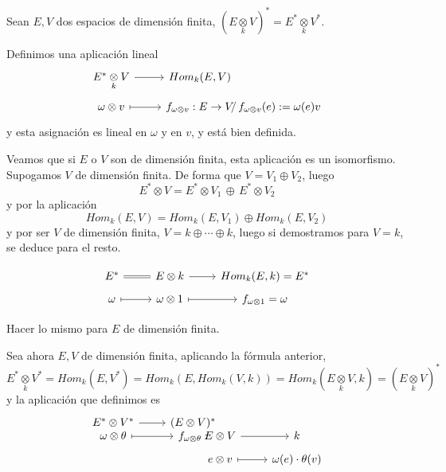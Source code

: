 \begin{prop}
    Sean $E,V$ dos espacios de dimensi\'on finita, $(E \underset{k}{\otimes}V)^* = E^* \underset{k}{\otimes}V^*$. 
\end{prop}
\begin{dem}
    Definimos una aplicaci\'on lineal
    $$\bt E^* \underset{k}{\otimes}V \arrow{r} & Hom_k(E,V) \\[-5mm] 
    \omega \otimes v \arrow[mapsto]{r} & f_{\omega\otimes v}: E \to V &[-13mm] \, /\, f_{\omega\otimes v}(e):= \omega (e) v   \et$$
    y esta asignaci\'on es lineal en $\omega$ y en $v$, y est\'a bien definida.

    Veamos que si $E$ o $V$ son de dimensi\'on finita, esta aplicaci\'on es un isomorfismo. Supogamos $V$ de dimensi\'on finita. De forma que $V=V_1\oplus V_2$, luego 
    $$E^* \otimes V = E^* \otimes V_1 \,  \oplus \, E^* \otimes V_2$$
    y por la aplicaci\'on
    $$Hom_k(E, V) = Hom_k(E,V_1) \oplus Hom_k(E, V_2)$$
    y por ser $V$ de dimensi\'on finita, $V=k \oplus \cdots \oplus k$, luego si demostramos para $V=k$, se deduce para el resto. 

    $$\bt E^* \arrow[equal]{r} & E\otimes k \arrow{r} & Hom_k(E,k) = E^* \\[-5mm] \omega \arrow[mapsto]{r} & \omega \otimes 1 \arrow[mapsto]{r} & f_{\omega \otimes 1} = \omega \et$$

    Hacer lo mismo para $E$ de dimensi\'on finita. 

    Sea ahora $E, V$ de dimensi\'on finita, aplicando la f\'ormula anterior,
    $$E^* \underset{k}{\otimes}V^* = Hom_k(E, V^*) = Hom_k(E, Hom_k(V,k)) = Hom_k(E\underset{k}{\otimes} V,k) = (E\underset{k}{\otimes} V)^*$$
    y la aplicaci\'on que definimos es
    $$\bt E^* \otimes V^* \arrow{r} & (E\otimes V)^* \\[-8mm] \omega \otimes \theta \arrow[mapsto]{r} & f_{\omega \otimes \theta}: &[-15mm] E\otimes V \arrow{r} & k \\[-5mm] & &[-15mm] e\otimes v \arrow[mapsto]{r} & \omega(e) \cdot \theta(v)\et$$
\end{dem}
